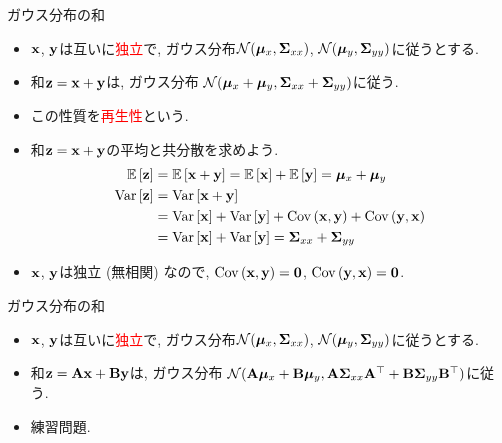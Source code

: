 \documentclass[dvipdfmx,notheorems,t]{beamer}
\begin{document}
\begin{frame}{ガウス分布の和}
\begin{itemize}
  \item $\vb{x}$, $\vb{y}$は互いに\textcolor{red}{独立}で,
  ガウス分布$\mathcal{N}(\vb*{\mu}_x, \vb{\Sigma}_{xx})$,
  $\mathcal{N}(\vb*{\mu}_y, \vb{\Sigma}_{yy})$に従うとする.
  \item 和$\vb{z} = \vb{x} + \vb{y}$は, ガウス分布
  $\mathcal{N}(\vb*{\mu}_x + \vb*{\mu}_y, \vb{\Sigma}_{xx} + \vb{\Sigma}_{yy})$に従う.
  \item この性質を\textcolor{red}{再生性}という.
  \item 和$\vb{z} = \vb{x} + \vb{y}$の平均と共分散を求めよう.
  \begin{align*}
    \operatorname{\mathbb{E}} \left[ \vb{z} \right] &= \operatorname{\mathbb{E}} \left[ \vb{x} + \vb{y} \right] = \operatorname{\mathbb{E}} \left[ \vb{x} \right] + \operatorname{\mathbb{E}} \left[ \vb{y} \right] = \vb*{\mu}_x + \vb*{\mu}_y \\
    \operatorname{Var} \left[ \vb{z} \right] &= \operatorname{Var} \left[ \vb{x} + \vb{y} \right] \\
      &= \operatorname{Var} \left[ \vb{x} \right] + \operatorname{Var} \left[ \vb{y} \right] + \operatorname{Cov} \left( \vb{x}, \vb{y} \right) + \operatorname{Cov} \left( \vb{y}, \vb{x} \right) \\
      &= \operatorname{Var} \left[ \vb{x} \right] + \operatorname{Var} \left[ \vb{y} \right] = \vb{\Sigma}_{xx} + \vb{\Sigma}_{yy}
  \end{align*}
  \item $\vb{x}$, $\vb{y}$は独立 (無相関) なので,
  $\operatorname{Cov} \left( \vb{x}, \vb{y} \right) = \vb{0}$, $\operatorname{Cov} \left( \vb{y}, \vb{x} \right) = \vb{0}$.
\end{itemize}
\end{frame}

\begin{frame}{ガウス分布の和}
\begin{itemize}
  \item $\vb{x}$, $\vb{y}$は互いに\textcolor{red}{独立}で,
  ガウス分布$\mathcal{N}(\vb*{\mu}_x, \vb{\Sigma}_{xx})$,
  $\mathcal{N}(\vb*{\mu}_y, \vb{\Sigma}_{yy})$に従うとする.
  \item 和$\vb{z} = \vb{A} \vb{x} + \vb{B} \vb{y}$は, ガウス分布
  $\mathcal{N}(\vb{A} \vb*{\mu}_x + \vb{B} \vb*{\mu}_y,
    \vb{A} \vb{\Sigma}_{xx} \vb{A}^\top + \vb{B} \vb{\Sigma}_{yy} \vb{B}^\top)$に従う.
  \item 練習問題.
\end{itemize}
\end{frame}
\end{document}
